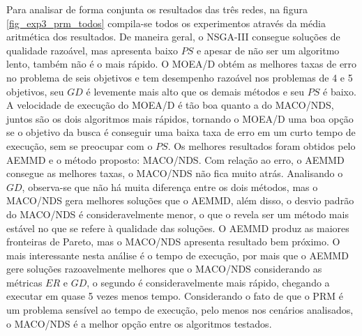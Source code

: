 Para analisar de forma conjunta os resultados das três redes, na figura \ref{fig_exp3_prm_todos} compila-se todos os experimentos através da média aritmética dos resultados. De maneira geral, o NSGA-III consegue soluções de qualidade razoável, mas apresenta baixo $PS$ e apesar de não ser um algoritmo lento, também não é o mais rápido. O MOEA/D obtém as melhores taxas de erro no problema de seis objetivos e tem desempenho razoável nos problemas de 4 e 5 objetivos, seu $GD$ é levemente mais alto que os demais métodos e seu $PS$ é baixo. A velocidade de execução do MOEA/D é tão boa quanto a do MACO/NDS, juntos são os dois algoritmos mais rápidos, tornando o MOEA/D uma boa opção se o objetivo da busca é conseguir uma baixa taxa de erro em um curto tempo de execução, sem se preocupar com o $PS$. Os melhores resultados foram obtidos pelo AEMMD e o método proposto: MACO/NDS. Com relação ao erro, o AEMMD consegue as melhores taxas, o MACO/NDS não fica muito atrás. Analisando o $GD$, observa-se que não há muita diferença entre os dois métodos, mas o MACO/NDS gera melhores soluções que o AEMMD, além disso, o desvio padrão do MACO/NDS é consideravelmente menor, o que o revela ser um método mais estável no que se refere à qualidade das soluções. O AEMMD produz as maiores fronteiras de Pareto, mas o MACO/NDS apresenta resultado bem próximo. O mais interessante nesta análise é o tempo de execução, por mais que o AEMMD gere soluções razoavelmente melhores que o MACO/NDS considerando as métricas $ER$ e $GD$, o segundo é consideravelmente mais rápido, chegando a executar em quase 5 vezes menos tempo. Considerando o fato de que o PRM é um problema sensível ao tempo de execução, pelo menos nos cenários analisados, o MACO/NDS é a melhor opção entre os algoritmos testados.

